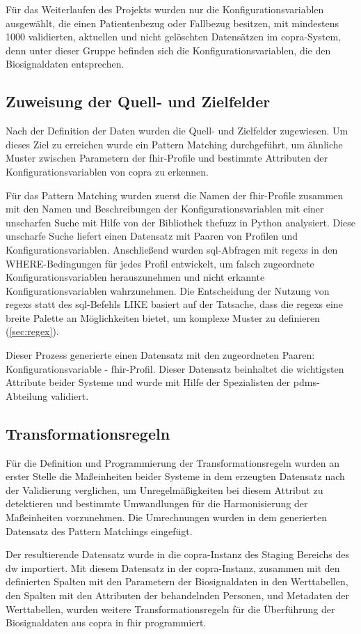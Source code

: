 Für das Weiterlaufen des Projekts wurden nur die Konfigurationsvariablen ausgewählt, die einen Patientenbezug oder Fallbezug besitzen, mit mindestens 1000 validierten, aktuellen und nicht gelöschten Datensätzen im \ac{copra}-System, denn unter dieser Gruppe befinden sich die Konfigurationsvariablen, die den Biosignaldaten entsprechen.

\subsection{Zuweisung der Quell- und Zielfelder} \label{sec:patternmatchingicucopra}

Nach der Definition der Daten wurden die Quell- und Zielfelder zugewiesen. Um dieses Ziel zu erreichen wurde ein Pattern Matching durchgeführt, um ähnliche Muster zwischen Parametern der \ac{fhir}-Profile und bestimmte Attributen der Konfigurationsvariablen von \ac{copra} zu erkennen. 

Für das Pattern Matching wurden zuerst die Namen der \ac{fhir}-Profile zusammen mit den Namen und Beschreibungen der Konfigurationsvariablen mit einer unscharfen Suche mit Hilfe von der Bibliothek \glqq thefuzz\grqq{} in Python analysiert. Diese unscharfe Suche liefert einen Datensatz mit Paaren von Profilen und Konfigurationsvariablen. Anschließend wurden \ac{sql}-Abfragen mit \acp{regex} in den WHERE-Bedingungen für jedes Profil entwickelt, um falsch zugeordnete Konfigurationsvariablen herauszunehmen und nicht erkannte Konfigurationsvariablen wahrzunehmen. Die Entscheidung der Nutzung von \acp{regex} statt des \ac{sql}-Befehls \glqq LIKE\grqq{} basiert auf der Tatsache, dass die \acp{regex} eine breite Palette an Möglichkeiten bietet, um komplexe Muster zu definieren (\ref{sec:regex}).

Dieser Prozess generierte einen Datensatz mit den zugeordneten Paaren: Konfigurationsvariable - \ac{fhir}-Profil. Dieser Datensatz beinhaltet die wichtigsten Attribute beider Systeme und wurde mit Hilfe der Spezialisten der \ac{pdms}-Abteilung validiert.

\subsection{Transformationsregeln} \label{sec:transformrules}

Für die Definition und Programmierung der Transformationsregeln wurden an erster Stelle die Maßeinheiten beider Systeme in dem erzeugten Datensatz nach der Validierung verglichen, um Unregelmäßigkeiten bei diesem Attribut zu detektieren und bestimmte Umwandlungen für die Harmonisierung der Maßeinheiten vorzunehmen. Die Umrechnungen wurden in dem generierten Datensatz des Pattern Matchings eingefügt.

Der resultierende Datensatz wurde in die \ac{copra}-Instanz des Staging Bereichs des \ac{dw} importiert. Mit diesem Datensatz in der \ac{copra}-Instanz, zusammen mit den definierten Spalten mit den Parametern der Biosignaldaten in den Werttabellen, den Spalten mit den Attributen der behandelnden Personen, und Metadaten der Werttabellen, wurden weitere Transformationsregeln für die Überführung der Biosignaldaten aus \ac{copra} in \ac{fhir} programmiert.